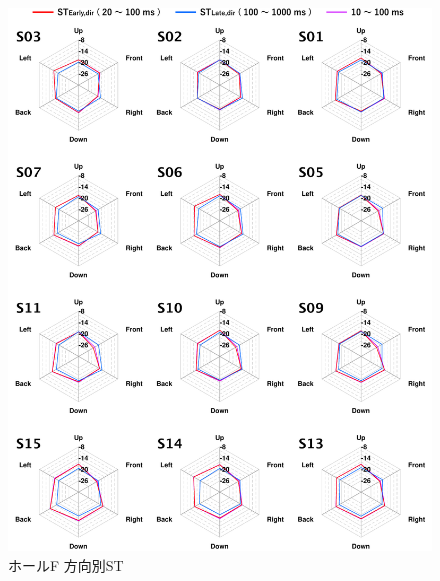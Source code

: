 \documentclass[11pt,a4j]{jreport}
\begin{document}
\newpage

\begin{figure}[H]
  \centering
  \includegraphics[scale=.77]{images/realHallDirSt/allPoint/reshaped/fRightPage.pdf}
  \caption{ホールF 方向別ST}
  \label{fig:ホールF 方向別ST}
\end{figure}

\newpage
  
\vspace{4\baselineskip}
\end{document}
